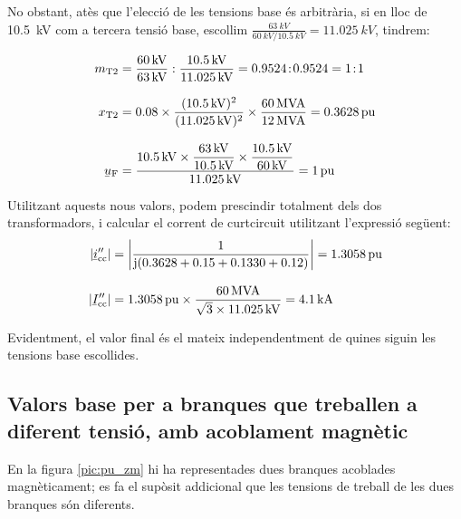 \begin{exemple}
     No obstant, atès que l'elecció de les tensions base és
     arbitrària, si en lloc de \SI{10,5}{kV} com a tercera tensió base,
     escollim
     $\frac{\SI{63}{kV}}{\SI{60}{kV} / \SI{10,5}{kV}}=\SI{11,025}{kV}$,
     tindrem:

    \begin{align*}
       m\ped{T2} &= \frac{\SI{60}{kV}}{\SI{63}{kV}} : \frac{\SI{10,5}{kV}}{\SI{11,025}{kV}}
       = \num{0,9524}\!:\!\num{0,9524} = 1\!:\!1 \\[3mm]
       x\ped{T2} &= \num{0,08} \times \frac{(\SI{10,5}{kV})^2}{(\SI{11,025}{kV})^2 } \times
       \frac{\SI{60}{MVA}}{\SI{12}{MVA}}  = \SI{0,3628}{pu}\\[3mm]
       \cmplx{u}\ped{F} &= \frac{\SI{10,5}{kV} \times \dfrac{\SI{63}{kV}}{\SI{10,5}{kV}} \times
       \dfrac{\SI{10,5}{kV}}{\SI{60}{kV}}}{\SI{11,025}{kV}} = \SI{1}{pu}
    \end{align*}

    Utilitzant aquests nous valors, podem prescindir totalment dels dos
    transformadors, i calcular el corrent de curtcircuit utilitzant
    l'expressió següent:
    \begin{align*}
    |\cmplx{i}''\ped{cc}| &= \left| \frac{1}{\ju ( \num{0,3628} + \num{0,15} +
    \num{0,1330} + \num{0,12} )} \right| = \SI{1,3058}{pu} \\[3mm]
    |\cmplx{I}''\ped{cc}| &=
    \SI{1,3058}{pu}\times\frac{\SI{60}{MVA}}{\sqrt{3}\times \SI{11,025}{kV}} =
    \SI{4,1}{kA}
    \end{align*}

    Evidentment, el valor final és el mateix independentment de quines
    siguin les tensions base escollides.
\end{exemple}

\subsection{Valors base per a branques que treballen a diferent tensió, amb acoblament magnètic}

En la figura \vref{pic:pu_zm} hi ha representades dues branques acoblades magnèticament; es fa el supòsit addicional que les tensions de treball de les dues branques són diferents.

\begin{center}
    
    \label{pic:pu_zm}
\end{center}


